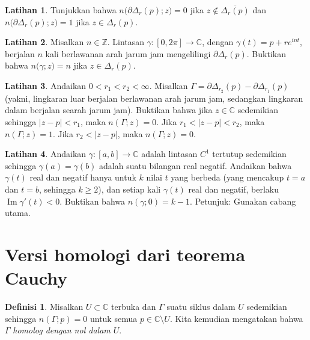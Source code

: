 \documentclass[12pt,openany]{book}
\renewcommand{\Im}{\operatorname{Im}}
\newcommand{\sabs}[1]{\lvert {#1} \rvert}
\newcommand{\C}{{\mathbb{C}}}
\newcommand{\Z}{{\mathbb{Z}}}
\newcommand{\myindex}[1]{#1\index{#1}}
\theoremstyle{plain}
\theoremstyle{remark}
\theoremstyle{definition}
\newtheorem{defn}[thm]{Definisi}
\newenvironment{exbox}{%
    \def\FrameCommand{\vrule width 1pt \relax\hspace{10pt}}%
    \MakeFramed{\advance\hsize-\width\FrameRestore}%
}{%
    \endMakeFramed
}
\theoremstyle{exercise}
\newtheorem{exercise}{Latihan}[section]
\theoremstyle{example}
\begin{document}
\begin{exbox}
\begin{exercise}%
\label{exercise:windingcircle}
Tunjukkan bahwa $n\bigl(\partial \Delta_r(p);z\bigr) = 0$ jika $z \notin
\overline{\Delta_r(p)}$ dan 
$n\bigl(\partial \Delta_r(p);z\bigr) = 1$ jika $z \in \Delta_r(p)$.
\end{exercise}

\begin{exercise}
Misalkan $n \in \Z$.  Lintasan $\gamma \colon [0,2\pi] \to \C$, dengan
$\gamma(t) = p + re^{in t}$, berjalan $n$ kali
berlawanan arah jarum jam mengelilingi $\partial \Delta_r(p)$.
Buktikan bahwa
$n\bigl(\gamma;z\bigr) = n$ jika $z \in \Delta_r(p)$.
\end{exercise}

\begin{exercise}%
\label{exercise:windingcircles}
Andaikan $0 < r_1 < r_2 < \infty$.
Misalkan $\Gamma = \partial \Delta_{r_2}(p) - \partial \Delta_{r_1} (p)$
(yakni, lingkaran luar berjalan berlawanan arah jarum jam, sedangkan lingkaran dalam berjalan
searah jarum jam).
Buktikan bahwa jika $z \in \C$ sedemikian sehingga $\sabs{z-p} < r_1$, maka
$n(\Gamma;z) = 0$.  Jika $r_1 < \sabs{z-p} < r_2$, maka
$n(\Gamma;z) = 1$.  Jika $r_2 < \sabs{z-p}$, maka
$n(\Gamma;z) = 0$.
\end{exercise}

\begin{exercise}%
\label{exercise:rayktimes}
Andaikan $\gamma \colon [a,b] \to \C$ adalah lintasan $C^1$ tertutup sedemikian sehingga
$\gamma(a) = \gamma(b)$ adalah suatu bilangan real negatif.  Andaikan
bahwa $\gamma(t)$ real dan negatif hanya untuk $k$ nilai $t$ yang berbeda (yang
mencakup $t=a$ dan $t=b$, sehingga $k \geq 2$), dan setiap kali $\gamma(t)$ real dan negatif,
berlaku $\Im \gamma'(t) < 0$.  Buktikan bahwa $n(\gamma;0) = k-1$.  Petunjuk: Gunakan
cabang utama.
\end{exercise}
\end{exbox}



\section{Versi homologi dari teorema Cauchy}

\begin{defn}
Misalkan $U \subset \C$ terbuka dan $\Gamma$
suatu siklus
dalam $U$
sedemikian sehingga $n(\Gamma;p) = 0$ untuk semua $p \in \C \setminus U$.
Kita kemudian
mengatakan bahwa $\Gamma$ \emph{\myindex{homolog dengan nol} dalam $U$}.
\end{defn}
\end{document}
